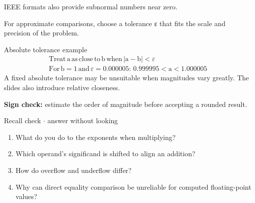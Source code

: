 \documentclass[11pt]{article}
\begin{document}
\begin{keepsection}
\begin{keepsection}
IEEE formats also provide subnormal numbers near zero.

For approximate comparisons, choose a tolerance ε that fits the scale and precision of the problem.

\begin{equationcard}{Absolute tolerance example}
\[ \begin{gathered} \text{Treat}\, \mathrm{a}\, \text{as}\, \text{close}\, \text{to}\, \mathrm{b}\, \text{when}\, |\mathrm{a}-\mathrm{b}|<ε \\ \text{For}\, \mathrm{b}=1\, \text{and}\, ε=0.000005:\, 0.999995<\mathrm{a}<1.000005 \end{gathered} \]
{\small A fixed absolute tolerance may be unsuitable when magnitudes vary greatly. The slides also introduce relative closeness.}
\end{equationcard}

\begin{notebox}\textbf{Sign check:} estimate the order of magnitude before accepting a rounded result.\end{notebox}

\begin{recallbox}{Recall check \ensuremath{\cdot} answer without looking}
\begin{enumerate}
\item What do you do to the exponents when multiplying?
\item Which operand’s significand is shifted to align an addition?
\item How do overflow and underflow differ?
\item Why can direct equality comparison be unreliable for computed floating-point values?
\end{enumerate}

\end{recallbox}
\end{keepsection}
\end{keepsection}
\end{document}
